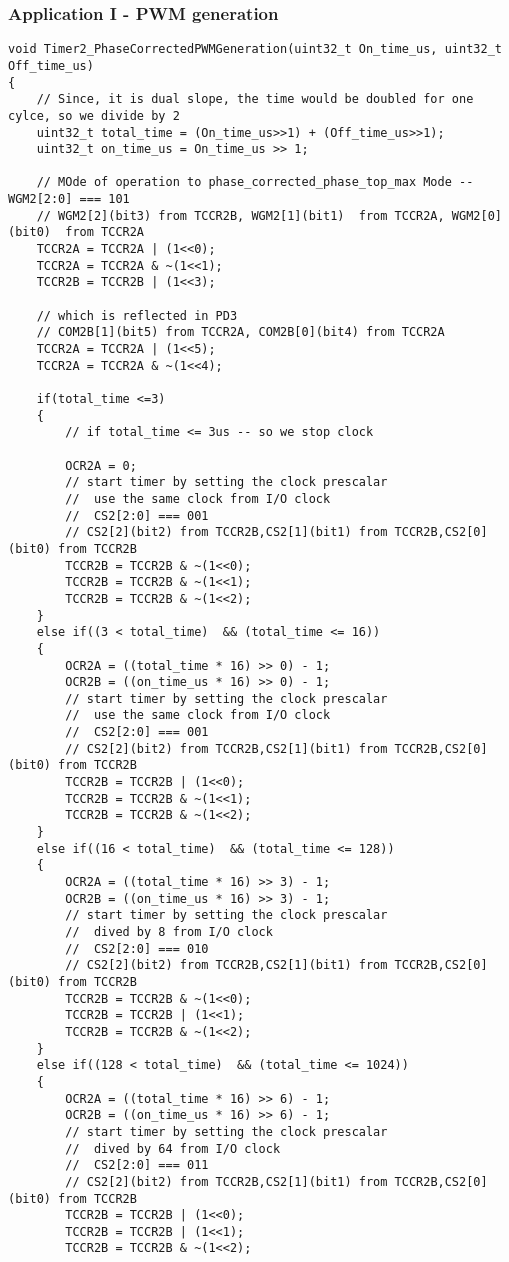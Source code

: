\subsubsection{Application I - PWM generation}
\begin{verbatim}
void Timer2_PhaseCorrectedPWMGeneration(uint32_t On_time_us, uint32_t Off_time_us)
{
	// Since, it is dual slope, the time would be doubled for one cylce, so we divide by 2
	uint32_t total_time = (On_time_us>>1) + (Off_time_us>>1);
	uint32_t on_time_us = On_time_us >> 1;
		
	// MOde of operation to phase_corrected_phase_top_max Mode -- WGM2[2:0] === 101
	// WGM2[2](bit3) from TCCR2B, WGM2[1](bit1)  from TCCR2A, WGM2[0](bit0)  from TCCR2A
	TCCR2A = TCCR2A | (1<<0);
	TCCR2A = TCCR2A & ~(1<<1);
	TCCR2B = TCCR2B | (1<<3);	

	// which is reflected in PD3
	// COM2B[1](bit5) from TCCR2A, COM2B[0](bit4) from TCCR2A
	TCCR2A = TCCR2A | (1<<5);
	TCCR2A = TCCR2A & ~(1<<4);
	
	if(total_time <=3)
	{
		// if total_time <= 3us -- so we stop clock
		
		OCR2A = 0;
		// start timer by setting the clock prescalar
		//  use the same clock from I/O clock
		//  CS2[2:0] === 001
		// CS2[2](bit2) from TCCR2B,CS2[1](bit1) from TCCR2B,CS2[0](bit0) from TCCR2B
		TCCR2B = TCCR2B & ~(1<<0);
		TCCR2B = TCCR2B & ~(1<<1);
		TCCR2B = TCCR2B & ~(1<<2);
	}
	else if((3 < total_time)  && (total_time <= 16))
	{
		OCR2A = ((total_time * 16) >> 0) - 1;
		OCR2B = ((on_time_us * 16) >> 0) - 1;
		// start timer by setting the clock prescalar
		//  use the same clock from I/O clock
		//  CS2[2:0] === 001
		// CS2[2](bit2) from TCCR2B,CS2[1](bit1) from TCCR2B,CS2[0](bit0) from TCCR2B
		TCCR2B = TCCR2B | (1<<0);
		TCCR2B = TCCR2B & ~(1<<1);
		TCCR2B = TCCR2B & ~(1<<2);
	}
	else if((16 < total_time)  && (total_time <= 128))
	{
		OCR2A = ((total_time * 16) >> 3) - 1;
		OCR2B = ((on_time_us * 16) >> 3) - 1;
		// start timer by setting the clock prescalar
		//  dived by 8 from I/O clock
		//  CS2[2:0] === 010
		// CS2[2](bit2) from TCCR2B,CS2[1](bit1) from TCCR2B,CS2[0](bit0) from TCCR2B
		TCCR2B = TCCR2B & ~(1<<0);
		TCCR2B = TCCR2B | (1<<1);
		TCCR2B = TCCR2B & ~(1<<2);
	}
	else if((128 < total_time)  && (total_time <= 1024))
	{
		OCR2A = ((total_time * 16) >> 6) - 1;
		OCR2B = ((on_time_us * 16) >> 6) - 1;
		// start timer by setting the clock prescalar
		//  dived by 64 from I/O clock
		//  CS2[2:0] === 011
		// CS2[2](bit2) from TCCR2B,CS2[1](bit1) from TCCR2B,CS2[0](bit0) from TCCR2B
		TCCR2B = TCCR2B | (1<<0);
		TCCR2B = TCCR2B | (1<<1);
		TCCR2B = TCCR2B & ~(1<<2);
		

\end{verbatim}
